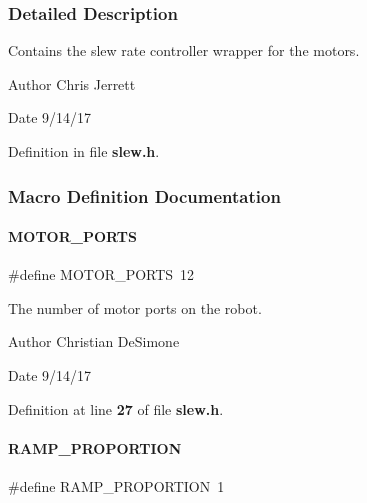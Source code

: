\subsubsection{Detailed Description}
Contains the slew rate controller wrapper for the motors. 

\begin{DoxyAuthor}{Author}
Chris Jerrett 
\end{DoxyAuthor}
\begin{DoxyDate}{Date}
9/14/17 
\end{DoxyDate}


Definition in file \textbf{ slew.\+h}.



\subsubsection{Macro Definition Documentation}
\mbox{\label{slew_8h_ad1ad4b29af4180aa00713599367fbc98}} 
\paragraph{M\+O\+T\+O\+R\+\_\+\+P\+O\+R\+TS}
{\footnotesize\ttfamily \#define M\+O\+T\+O\+R\+\_\+\+P\+O\+R\+TS~12}



The number of motor ports on the robot. 

\begin{DoxyAuthor}{Author}
Christian De\+Simone 
\end{DoxyAuthor}
\begin{DoxyDate}{Date}
9/14/17 
\end{DoxyDate}


Definition at line \textbf{ 27} of file \textbf{ slew.\+h}.

\mbox{\label{slew_8h_a4a3ff8667251227c99f8f4c81e9ff467}} 
\paragraph{R\+A\+M\+P\+\_\+\+P\+R\+O\+P\+O\+R\+T\+I\+ON}
{\footnotesize\ttfamily \#define R\+A\+M\+P\+\_\+\+P\+R\+O\+P\+O\+R\+T\+I\+ON~1}



